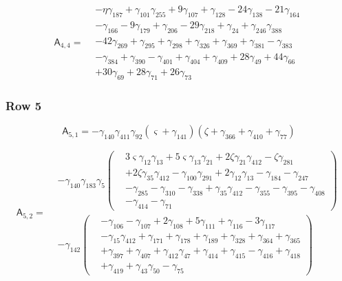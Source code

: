 \[\mathsf A_{4,4}=\begin{aligned}&- \eta  \gamma_{187}+ \gamma_{101} \gamma_{255}+ 9 \gamma_{107}+ \gamma_{128}- 24 \gamma_{138}- 21 \gamma_{164}\\&- \gamma_{166}- 9 \gamma_{179}+ \gamma_{206}- 29 \gamma_{218}+ \gamma_{24}+ \gamma_{246} \gamma_{388}\\&- 42 \gamma_{269}+ \gamma_{295}+ \gamma_{298}+ \gamma_{326}+ \gamma_{369}+ \gamma_{381}- \gamma_{383}\\&- \gamma_{384}+ \gamma_{390}- \gamma_{401}+ \gamma_{404}+ \gamma_{409}+ 28 \gamma_{49}+ 44 \gamma_{66}\\&+ 30 \gamma_{69}+ 28 \gamma_{71}+ 26 \gamma_{73}\end{aligned}\]

\subsubsection*{Row 5}
\[\mathsf A_{5,1}=- \gamma_{140} \gamma_{411} \gamma_{92} \left(\varsigma  + \gamma_{141}\right) \left(\zeta  + \gamma_{366} + \gamma_{410} + \gamma_{77}\right)\]

\[\mathsf A_{5,2}=\begin{aligned}&- \gamma_{140} \gamma_{183} \gamma_{5} \left(\begin{aligned}& 3 \varsigma  \gamma_{12} \gamma_{13}+ 5 \varsigma  \gamma_{13} \gamma_{21}+ 2 \zeta  \gamma_{21} \gamma_{412}- \zeta  \gamma_{281}\\&+ 2 \zeta  \gamma_{35} \gamma_{412}- \gamma_{100} \gamma_{291}+ 2 \gamma_{12} \gamma_{13}- \gamma_{184}- \gamma_{247}\\&- \gamma_{285}- \gamma_{310}- \gamma_{338}+ \gamma_{35} \gamma_{412}- \gamma_{355}- \gamma_{395}- \gamma_{408}\\&- \gamma_{414}- \gamma_{71}\end{aligned}\right)\\&- \gamma_{142} \left(\begin{aligned}&- \gamma_{106}- \gamma_{107}+ 2 \gamma_{108}+ 5 \gamma_{111}+ \gamma_{116}- 3 \gamma_{117}\\&- \gamma_{15} \gamma_{412}+ \gamma_{171}+ \gamma_{178}+ \gamma_{189}+ \gamma_{328}+ \gamma_{364}+ \gamma_{365}\\&+ \gamma_{397}+ \gamma_{407}+ \gamma_{412} \gamma_{47}+ \gamma_{414}+ \gamma_{415}- \gamma_{416}+ \gamma_{418}\\&+ \gamma_{419}+ \gamma_{43} \gamma_{50}- \gamma_{75}\end{aligned}\right)\end{aligned}\]


